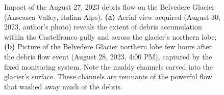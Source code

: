 \begin{figure}[ht!]
    \centering
    \caption{Impact of the August 27, 2023 debris flow on the Belvedere Glacier (Anscasca Valley, Italian Alps). \textbf{(a)} Aerial view acquired (August 30, 2023, author's photo) reveals the extent of debris accumulation within the Castelfranco gully and across the glacier's northern lobe; \textbf{(b)} Picture of the Belvedere Glacier northern lobe few hours after the debris flow event (August 28, 2023, 4:00 PM), captured by the fixed monitoring system. Note the 
    muddy channels carved into the glacier's surface. These channels are remnants of the powerful flow that washed away much of the debris.
    }
    \label{fig:1:belvedere_debris_flow}
\end{figure}

